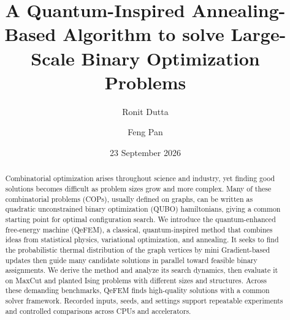 \documentclass[
  aps,
  prx,
  reprint,
  amsmath,
  amssymb,
  groupedaddress,
  nofootinbib,
  floatfix,
  longbibliography
]{revtex4-2}
\newcommand{\QeFEM}{QeFEM}
\begin{document}
\title{A Quantum-Inspired Annealing-Based Algorithm to solve Large-Scale Binary Optimization Problems}
\author{Ronit Dutta}
\author{Feng Pan}
\date{23 September 2026}

\begin{abstract}
Combinatorial optimization arises throughout science and industry, yet
finding good solutions becomes difficult as problem sizes grow and more complex. 
Many of these combinatorial problems (COPs), usually defined on graphs, can be 
written as quadratic unconstrained binary optimization (QUBO) hamiltonians, 
giving a common starting point for optimal configuration search. We introduce the 
quantum-enhanced free-energy machine (\QeFEM), a classical, quantum-inspired method 
that combines ideas from statistical physics, variational optimization, and annealing. 
It seeks to find the probabilistic thermal distribution of the graph vertices by mini
Gradient-based updates then guide
many candidate solutions in parallel toward feasible binary assignments.
We derive the method and analyze its search dynamics, then evaluate it on
MaxCut and planted Ising problems with different sizes and structures.
Across these demanding benchmarks, \QeFEM{} finds high-quality solutions
with a common solver framework. Recorded inputs, seeds, and settings
support repeatable experiments and controlled comparisons across CPUs
and accelerators.
\end{abstract}

\maketitle









\clearpage



\onecolumngrid
\appendix



\end{document}
